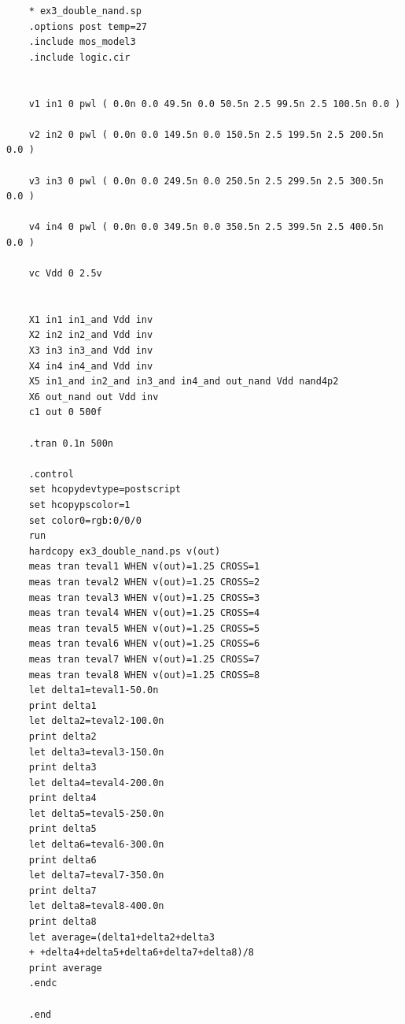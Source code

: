 \documentclass{jsarticle}
\begin{document}
\begin{lstlisting}
    * ex3_double_nand.sp
    .options post temp=27
    .include mos_model3
    .include logic.cir
    
    
    v1 in1 0 pwl ( 0.0n 0.0 49.5n 0.0 50.5n 2.5 99.5n 2.5 100.5n 0.0 )
    
    v2 in2 0 pwl ( 0.0n 0.0 149.5n 0.0 150.5n 2.5 199.5n 2.5 200.5n 0.0 )
    
    v3 in3 0 pwl ( 0.0n 0.0 249.5n 0.0 250.5n 2.5 299.5n 2.5 300.5n 0.0 )
    
    v4 in4 0 pwl ( 0.0n 0.0 349.5n 0.0 350.5n 2.5 399.5n 2.5 400.5n 0.0 )
    
    vc Vdd 0 2.5v
    
    
    X1 in1 in1_and Vdd inv
    X2 in2 in2_and Vdd inv
    X3 in3 in3_and Vdd inv
    X4 in4 in4_and Vdd inv
    X5 in1_and in2_and in3_and in4_and out_nand Vdd nand4p2
    X6 out_nand out Vdd inv
    c1 out 0 500f
    
    .tran 0.1n 500n
    
    .control
    set hcopydevtype=postscript
    set hcopypscolor=1
    set color0=rgb:0/0/0
    run
    hardcopy ex3_double_nand.ps v(out)
    meas tran teval1 WHEN v(out)=1.25 CROSS=1
    meas tran teval2 WHEN v(out)=1.25 CROSS=2
    meas tran teval3 WHEN v(out)=1.25 CROSS=3
    meas tran teval4 WHEN v(out)=1.25 CROSS=4
    meas tran teval5 WHEN v(out)=1.25 CROSS=5
    meas tran teval6 WHEN v(out)=1.25 CROSS=6
    meas tran teval7 WHEN v(out)=1.25 CROSS=7
    meas tran teval8 WHEN v(out)=1.25 CROSS=8
    let delta1=teval1-50.0n
    print delta1
    let delta2=teval2-100.0n
    print delta2
    let delta3=teval3-150.0n
    print delta3
    let delta4=teval4-200.0n
    print delta4
    let delta5=teval5-250.0n
    print delta5
    let delta6=teval6-300.0n
    print delta6
    let delta7=teval7-350.0n
    print delta7
    let delta8=teval8-400.0n
    print delta8
    let average=(delta1+delta2+delta3
    + +delta4+delta5+delta6+delta7+delta8)/8
    print average
    .endc
    
    .end
    
\end{lstlisting}
\end{document}
